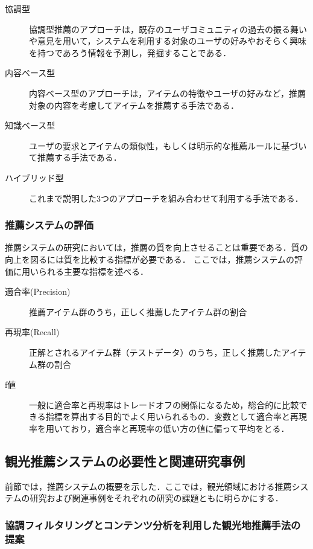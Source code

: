 \documentclass{jsarticle}
\begin{document}
\begin{description}
\item[協調型] 協調型推薦のアプローチは，既存のユーザコミュニティの過去の振る舞いや意見を用いて，システムを利用する対象のユーザの好みやおそらく興味を持つであろう情報を予測し，発掘することである．
\item[内容ベース型] 内容ベース型のアプローチは，アイテムの特徴やユーザの好みなど，推薦対象の内容を考慮してアイテムを推薦する手法である．
\item[知識ベース型] ユーザの要求とアイテムの類似性，もしくは明示的な推薦ルールに基づいて推薦する手法である．
\item[ハイブリッド型] これまで説明した3つのアプローチを組み合わせて利用する手法である．
\end{description}

\subsubsection{推薦システムの評価}

推薦システムの研究においては，推薦の質を向上させることは重要である．質の向上を図るには質を比較する指標が必要である．
ここでは，推薦システムの評価に用いられる主要な指標を述べる．

\begin{description}
\item[適合率(Precision)] 推薦アイテム群のうち，正しく推薦したアイテム群の割合
\item[再現率(Recall)]  正解とされるアイテム群（テストデータ）のうち，正しく推薦したアイテム群の割合
\item[f値]  一般に適合率と再現率はトレードオフの関係になるため，総合的に比較できる指標を算出する目的でよく用いられるもの．変数として適合率と再現率を用いており，適合率と再現率の低い方の値に偏って平均をとる．
\end{description}

\subsection{観光推薦システムの必要性と関連研究事例}

前節では，推薦システムの概要を示した．ここでは，観光領域における推薦システムの研究および関連事例をそれぞれの研究の課題ともに明らかにする．

\subsubsection{協調フィルタリングとコンテンツ分析を利用した観光地推薦手法の提案}
\end{document}
